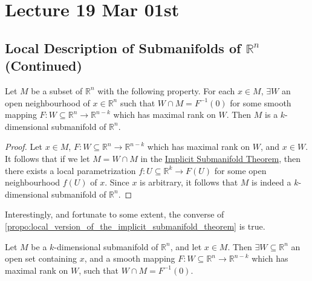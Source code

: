 \documentclass[notoc,notitlepage]{tufte-book}
\begin{document}


\chapter{Lecture 19 Mar 01st}%
\label{chp:lecture_19_mar_01st}

\section{Local Description of Submanifolds of \texorpdfstring{$\mathbb{R}^n$}{Rn} (Continued)}%
\label{sec:local_description_of_submanifolds_of_r_n_continued}

\begin{propo}\label{propo:local_version_of_the_implicit_submanifold_theorem}
  Let $M$ be a subset of $\mathbb{R}^n$ with the following property. For each $x
  \in M$, $\exists W$ an open neighbourhood of $x \in \mathbb{R}^n$ such that
  $W \cap M = F^{-1}(0)$ for some smooth mapping $F : W \subseteq \mathbb{R}^n
  \to \mathbb{R}^{n - k}$ which has maximal rank on $W$. Then $M$ is a
  $k$-dimensional submanifold of $\mathbb{R}^n$.
\end{propo}

\begin{proof}
  Let $x \in M$, $F : W \subseteq \mathbb{R}^n \to \mathbb{R}^{n - k}$ which has
  maximal rank on $W$, and $x \in W$. It follows that if we let $M = W \cap M$
  in the \hyperref[thm:implicit_submanifold_theorem]{Implicit Submanifold
  Theorem}, then there exists a local parametrization $f : U \subseteq
  \mathbb{R}^k \to F(U)$ for some open neighbourhood $f(U)$ of $x$. Since $x$ is
  arbitrary, it follows that $M$ is indeed a $k$-dimensional submanifold of
  $\mathbb{R}^n$.
\end{proof}

Interestingly, and fortunate to some extent, the converse of \\
\noindent
\cref{propo:local_version_of_the_implicit_submanifold_theorem} is true.

\begin{propo}\label{propo:converse_of_the_local_version_of_the_implicit_submanifold_theorem}
  Let $M$ be a $k$-dimensional submanifold of $\mathbb{R}^n$, and let $x \in M$.
  Then $\exists W \subseteq \mathbb{R}^n$ an open set containing $x$, and a
  smooth mapping $F : W \subseteq \mathbb{R}^n \to \mathbb{R}^{n - k}$ which has
  maximal rank on $W$, such that $W \cap M = F^{-1}(0)$.
\end{propo}
\end{document}
